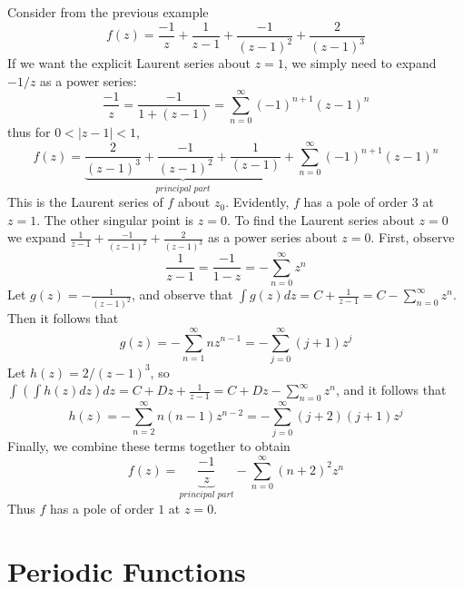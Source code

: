\begin{example}
    Consider from the previous example \begin{equation*}
        f(z) = \frac{-1}{z}+\frac{1}{z-1}+\frac{-1}{(z-1)^2}+\frac{2}{(z-1)^3}
    \end{equation*}
    If we want the explicit Laurent series about $z=1$, we simply need to expand $-1/z$ as a power series: \begin{equation*}
        \frac{-1}{z} = \frac{-1}{1+(z-1)} = \sum_{n=0}^{\infty}(-1)^{n+1}(z-1)^n
    \end{equation*}
    thus for $0 < |z-1| < 1$, \begin{equation*}
        f(z) = \underbrace{\frac{2}{(z-1)^3}+\frac{-1}{(z-1)^2}+\frac{1}{(z-1)}}_{principal\;part} + \sum_{n=0}^{\infty}(-1)^{n+1}(z-1)^n
    \end{equation*}
    This is the Laurent series of $f$ about $z_0$. Evidently, $f$ has a pole of order $3$ at $z = 1$. The other singular point is $z = 0$. To find the Laurent series about $z = 0$ we expand $\frac{1}{z-1}+\frac{-1}{(z-1)^2}+\frac{2}{(z-1)^3}$ as a power series about $z = 0$. First, observe \begin{equation*}
        \frac{1}{z-1} = \frac{-1}{1-z} = -\sum_{n=0}^{\infty}z^n
    \end{equation*}
    Let $g(z) = -\frac{1}{(z-1)^2}$, and observe that $\int g(z)dz = C + \frac{1}{z-1} = C - \sum_{n=0}^{\infty}z^n$. Then it follows that \begin{equation*}
        g(z) = -\sum_{n=1}^{\infty}nz^{n-1} = -\sum_{j=0}^{\infty}(j+1)z^j
    \end{equation*}
    Let $h(z) = 2/(z-1)^3$, so $\int(\int h(z)dz)dz = C+Dz+\frac{1}{z-1} = C+Dz - \sum_{n=0}^{\infty}z^n$, and it follows that \begin{equation*}
        h(z) = -\sum_{n=2}^{\infty}n(n-1)z^{n-2} = -\sum_{j=0}^{\infty}(j+2)(j+1)z^j
    \end{equation*}
    Finally, we combine these terms together to obtain \begin{equation*}
        f(z) = \underbrace{\frac{-1}{z}}_{principal\;part} -\sum_{n=0}^{\infty}(n+2)^2z^n
    \end{equation*}
    Thus $f$ has a pole of order $1$ at $z = 0$.
\end{example}



\section{Periodic Functions}

